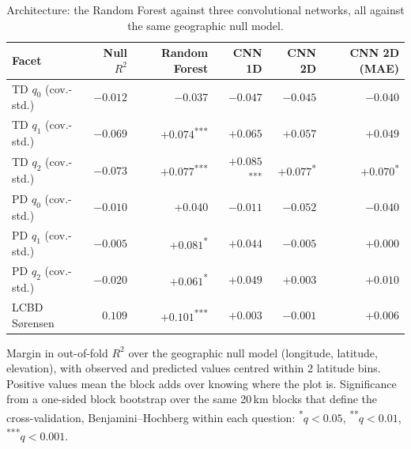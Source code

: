 \begin{table}[t]
\centering
\footnotesize
\caption{Architecture: the Random Forest against three convolutional networks, all against the same geographic null model.}
\label{tab:architecture}
\begin{tabular}{lrrrrr}
\toprule
Facet & Null $R^2$ & Random Forest & CNN 1D & CNN 2D & CNN 2D (MAE) \\
\midrule
TD $q_0$ (cov.-std.) & $-0.012$ & $-0.037$ & $-0.047$ & $-0.045$ & $-0.040$ \\
TD $q_1$ (cov.-std.) & $-0.069$ & $+0.074$\textsuperscript{***} & $+0.065$ & $+0.057$ & $+0.049$ \\
TD $q_2$ (cov.-std.) & $-0.073$ & $+0.077$\textsuperscript{***} & $+0.085$\textsuperscript{***} & $+0.077$\textsuperscript{*} & $+0.070$\textsuperscript{*} \\
PD $q_0$ (cov.-std.) & $-0.010$ & $+0.040$ & $-0.011$ & $-0.052$ & $-0.040$ \\
PD $q_1$ (cov.-std.) & $-0.005$ & $+0.081$\textsuperscript{*} & $+0.044$ & $-0.005$ & $+0.000$ \\
PD $q_2$ (cov.-std.) & $-0.020$ & $+0.061$\textsuperscript{*} & $+0.049$ & $+0.003$ & $+0.010$ \\
LCBD Sørensen & $0.109$ & $+0.101$\textsuperscript{***} & $+0.003$ & $-0.001$ & $+0.006$ \\
\bottomrule
\end{tabular}
\begin{minipage}{\textwidth}\footnotesize\vspace{2pt}Margin in out-of-fold $R^2$ over the geographic null model (longitude, latitude, elevation), with observed and predicted values centred within 2\textdegree{} latitude bins. Positive values mean the block adds over knowing where the plot is. Significance from a one-sided block bootstrap over the same 20\,km blocks that define the cross-validation, Benjamini--Hochberg within each question: \textsuperscript{*}$q<0.05$, \textsuperscript{**}$q<0.01$, \textsuperscript{***}$q<0.001$.\end{minipage}
\end{table}
